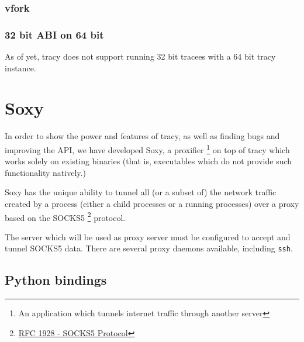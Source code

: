 \documentclass[a4paper, 10pt]{report}
\begin{document}


\subsection{vfork}


\subsection{32 bit ABI on 64 bit}

As of yet, tracy does not support running 32 bit tracees with a 64 bit
tracy instance.




\chapter{Soxy}
\label{chapter:soxy}

In order to show the power and features of tracy, as well as finding bugs and
improving the API, we have developed Soxy, a proxifier \footnote{An
application which tunnels internet traffic through another server} on top of
tracy which works solely on existing binaries (that is, executables which do
not provide such functionality natively.)

Soxy has the unique ability to tunnel all (or a subset of) the network traffic
created by a process (either a child processes or a running processes) over a
proxy based on the SOCKS5 \footnote{\href{http://www.ietf.org/rfc/rfc1928.txt}
{RFC 1928 - SOCKS5 Protocol}} protocol.

The server which will be used as proxy server must be configured to accept and
tunnel SOCKS5 data. There are several proxy daemons available, including
\verb=ssh=.

\section{Python bindings}

\end{document}
